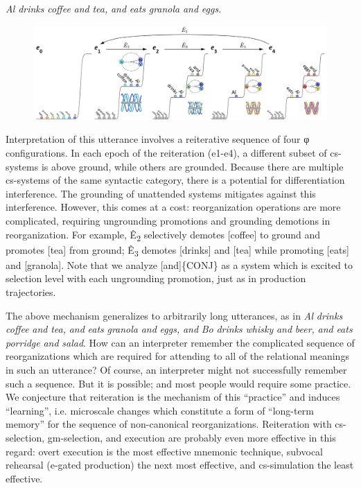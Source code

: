 \textit{Al} \textit{drinks} \textit{coffee} \textit{and} \textit{tea,} \textit{and} \textit{eats} \textit{granola} \textit{and} \textit{eggs.}

  
\begin{figure}
\includegraphics[width=\textwidth]{figures/Tilsen-img123.png}
\caption{\missingcaption}
\label{fig:}
\end{figure}
 

  Interpretation of this utterance involves a reiterative sequence of four φ configurations. In each epoch of the reiteration (e1-e4), a different subset of cs-systems is above ground, while others are grounded. Because there are multiple cs-systems of the same syntactic category, there is a potential for differentiation interference. The grounding of unattended systems mitigates against this interference. However, this comes at a cost: reorganization operations are more complicated, requiring ungrounding promotions and grounding demotions in reorganization. For example, Ê\textsubscript{2} selectively demotes [coffee] to ground and promotes [tea] from ground; Ê\textsubscript{3} demotes [drinks] and [tea] while promoting [eats] and [granola]. Note that we analyze [and]\{CONJ\} as a system which is excited to selection level with each ungrounding promotion, just as in production trajectories.

  The above mechanism generalizes to arbitrarily long utterances, as in \textit{Al} \textit{drinks} \textit{coffee} \textit{and} \textit{tea,} \textit{and} \textit{eats} \textit{granola} \textit{and} \textit{eggs,} \textit{and} \textit{Bo} \textit{drinks} \textit{whisky} \textit{and} \textit{beer,} \textit{and} \textit{eats} \textit{porridge} \textit{and} \textit{salad}. How can an interpreter remember the complicated sequence of reorganizations which are required for attending to all of the relational meanings in such an utterance? Of course, an interpreter might not successfully remember such a sequence. But it is possible; and most people would require some practice. We conjecture that reiteration is the mechanism of this “practice” and induces “learning”, i.e. microscale changes which constitute a form of “long-term memory” for the sequence of non-canonical reorganizations. Reiteration with cs-selection, gm-selection, and execution are probably even more effective in this regard: overt execution is the most effective mnemonic technique, subvocal rehearsal (e-gated production) the next most effective, and cs-simulation the least effective.

